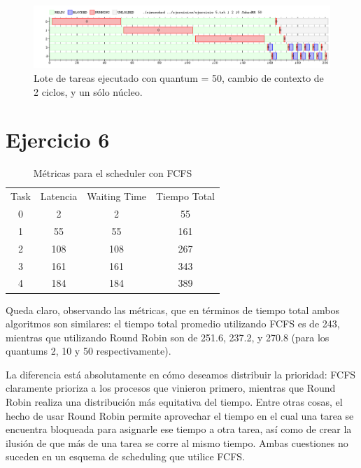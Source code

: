 \documentclass{article}
\begin{document}
\begin{figure}[h!]
\caption{Lote de tareas ejecutado con quantum = 50, cambio de contexto de 2 ciclos, y un sólo núcleo. \label{grf:ex5-50}}
\centering
\includegraphics[width=15cm]{../ejercicios/ejercicio 5 - quantum 50}
\end{figure}

\section{Ejercicio 6}

\begin{table}[h!]
\centering
\caption{Métricas para el scheduler con FCFS}
\label{tbl:ex6}
\begin{tabular}{cccc}
Task & Latencia & Waiting Time & Tiempo Total \\
0    & 2        & 2            & 55           \\
1    & 55       & 55           & 161           \\
2    & 108      & 108          & 267           \\
3    & 161      & 161          & 343           \\
4    & 184      & 184          & 389          
\end{tabular}
\end{table}

Queda claro, observando las métricas, que en términos de tiempo total ambos algoritmos son similares: el tiempo total promedio utilizando FCFS es de 243, mientras que utilizando Round Robin son de 251.6, 237.2, y 270.8 (para los quantums 2, 10 y 50 respectivamente).

La diferencia está absolutamente en cómo deseamos distribuir la prioridad: FCFS claramente prioriza a los procesos que vinieron primero, mientras que Round Robin realiza una distribución más equitativa del tiempo. Entre otras cosas, el hecho de usar Round Robin permite aprovechar el tiempo en el cual una tarea se encuentra bloqueada para asignarle ese tiempo a otra tarea, así como de crear la ilusión de que más de una tarea se corre al mismo tiempo. Ambas cuestiones no suceden en un esquema de scheduling que utilice FCFS.
\end{document}
